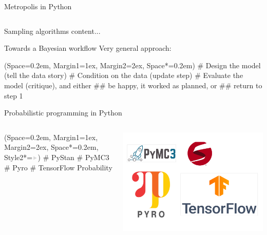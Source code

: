 \documentclass[12pt, aspectratio=149]{beamer}
\newcommand{\listSpace}{0.2em}
\theoremstyle{plain}
\begin{document}
\begin{frame}[fragile]{Metropolis in Python}
	\inputminted[fontsize=\tiny]{python}{../code/metropolis.py}
\end{frame}

\begin{frame}[fragile]{Sampling algorithms}
	content...
\end{frame}

\begin{frame}[fragile]{Towards a Bayesian workflow}
	Very general approach:
	\begin{easylist}[enumerate]
		\ListProperties(Space=\listSpace, Margin1=1ex, Margin2=2ex, Space*=\listSpace)
		# Design the model (tell the data story)
		# Condition on the data (update step)
		# Evaluate the model (critique), and either
		## be happy, it worked as planned, or
		## return to step 1
	\end{easylist}
\end{frame}

\begin{frame}[fragile]{Probabilistic programming in Python}
	\begin{columns}
		\begin{column}{0.5\linewidth}
			\begin{easylist}[itemize]
				\ListProperties(Space=\listSpace, Margin1=1ex, Margin2=2ex, Space*=\listSpace, Style2*=$\color{bggraydark}\blacktriangleright$\space)
				# PyStan
				# PyMC3
				# Pyro
				# TensorFlow Probability
			\end{easylist}
		\end{column}
		\begin{column}{0.5\textwidth}
			\includegraphics[width=\textwidth]{figs/logos.pdf}
		\end{column}
	\end{columns}
\end{frame}
\end{document}
